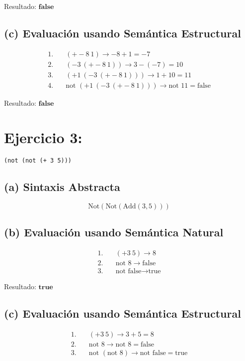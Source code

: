 \documentclass[12pt,letterpaper]{article}
\begin{document}
Resultado: \(\mathbf{false}\)

\subsection*{(c) Evaluación usando Semántica Estructural}

\begin{align*}
1. &\quad (+ -8\ 1) \rightarrow -8 + 1 = -7 \\
2. &\quad (- 3\ (+ -8\ 1)) \rightarrow 3 - (-7) = 10 \\
3. &\quad (+ 1\ (- 3\ (+ -8\ 1))) \rightarrow 1 + 10 = 11 \\
4. &\quad \text{not } (+ 1\ (- 3\ (+ -8\ 1))) \rightarrow \text{not } 11 = \text{false}
\end{align*}

Resultado: \(\mathbf{false}\)

\vspace{0.5cm}

\section*{Ejercicio 3:} 
\texttt{\large(not (not (+ 3 5)))}

\subsection*{(a) Sintaxis Abstracta}
\[
\text{Not}(\text{Not}(\text{Add}(3, 5)))
\]

\subsection*{(b) Evaluación usando Semántica Natural}

\begin{align*}
1. &\quad (+ 3\ 5) \rightarrow 8 \\
2. &\quad \text{not } 8 \rightarrow \text{false} \\
3. &\quad \text{not } \text{false} \rightarrow \text{true}
\end{align*}

Resultado: \(\mathbf{true}\)

\subsection*{(c) Evaluación usando Semántica Estructural}

\begin{align*}
1. &\quad (+ 3\ 5) \rightarrow 3 + 5 = 8 \\
2. &\quad \text{not } 8 \rightarrow \text{not } 8 = \text{false} \\
3. &\quad \text{not } (\text{not } 8) \rightarrow \text{not } \text{false} = \text{true}
\end{align*}
\end{document}
